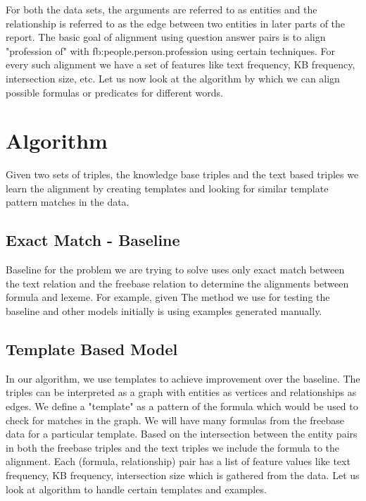 \documentclass[12pt, a4paper]{article}
\begin{document}
For both the data sets, the arguments are referred to as entities and the relationship is referred to as the edge between two entities in later parts of the report. The basic goal of alignment using question answer pairs is to align "profession of" with fb:people.person.profession using certain techniques. For every such alignment we have a set of features like text frequency, KB frequency, intersection size, etc.
Let us now look at the algorithm by which we can align possible formulas or predicates for different words.

\section{Algorithm}
Given two sets of triples, the knowledge base triples and the text based triples we learn the alignment by creating templates and looking for similar template pattern matches in the data.\\

\subsection{Exact Match - Baseline}
Baseline for the problem we are trying to solve uses only exact match between the text relation and the freebase relation to determine the alignments between formula and lexeme. For example, given The method we use for testing the baseline and other models initially is using examples generated manually. 

\subsection{Template Based Model}
In our algorithm, we use templates to achieve improvement over the baseline. The triples can be interpreted as a graph with entities as vertices and relationships as edges. We define a "template" as a pattern of the formula which would be used to check for matches in the graph. We will have many formulas from the freebase data for a particular template. Based on the intersection between the entity pairs in both the freebase triples and the text triples we include the formula to the alignment. Each (formula, relationship) pair has a list of feature values like text frequency, KB frequency, intersection size which is gathered from the data. Let us look at algorithm to handle certain templates and examples.\\
\end{document}
